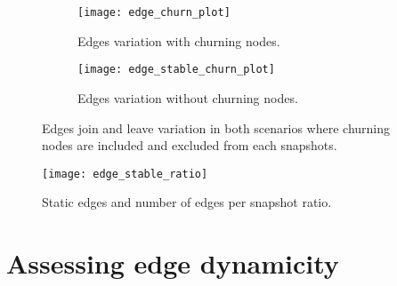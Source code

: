 	\begin{figure}[h]
		\centering
		\begin{subfigure}{0.7 \linewidth}
			\centering
			\texttt{[image: edge\_churn\_plot]}
			\caption{Edges variation with churning nodes.}
		\end{subfigure}
		\begin{subfigure}{0.7 \linewidth}
		\centering
		\texttt{[image: edge\_stable\_churn\_plot]}
		\caption{Edges variation without churning nodes.}
	\end{subfigure}
	\caption{Edges join and leave variation in both scenarios where churning nodes are included and excluded from each snapshots.}
	\label{fig:edge_churn}
	\end{figure}

	\begin{figure}[t]
		\texttt{[image: edge\_stable\_ratio]}
		\caption{Static edges and number of edges per snapshot ratio.}
		\label{fig:edge_stable_ratio}
	\end{figure}
	
	\section{Assessing edge dynamicity}
	
